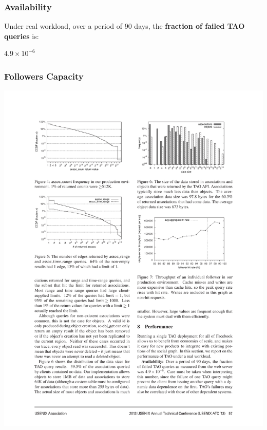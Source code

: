 \begin{frame}[c]\frametitle{Availability}
Under real workload, over a period of 90 days, the \textbf{fraction of failed TAO queries} is:
\begin{center}
	\huge $4.9 \times 10^{-6}$
\end{center}

\end{frame}
\begin{frame}[c]\frametitle{Followers Capacity}
	\centering
    \includegraphics[width=\textwidth]{figs/followercapacity.pdf}
\end{frame}

